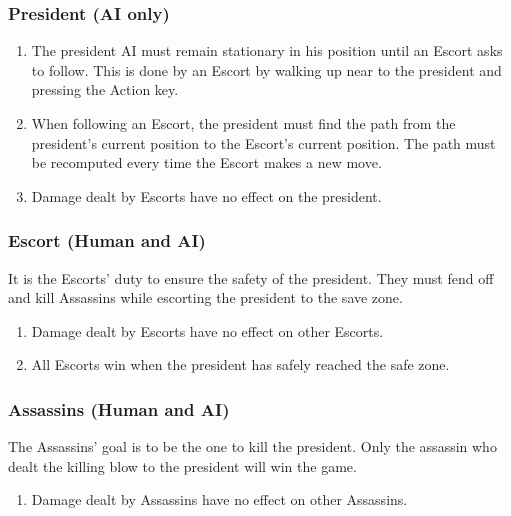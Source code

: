 \documentclass[12pt]{article}
\newenvironment{req} {\begin{enumerate}[leftmargin=2.5cm, label = \textbf{REQ \arabic{subsection}.\arabic{subsubsection}.\arabic*:}]} {\end{enumerate}}
\begin{document}
\subsubsection{President (AI only)}
\begin{req}
	\item The president AI must remain stationary in his position until an Escort asks to follow. This is done by an Escort by walking up near to the president and pressing the Action key.
	\item When following an Escort, the president must find the path from the president's current position to the Escort's current position. The path must be recomputed every time the Escort makes a new move.
	\item Damage dealt by Escorts have no effect on the president.
\end{req}

\subsubsection{Escort (Human and AI)}
It is the Escorts' duty to ensure the safety of the president. They must fend off and kill Assassins while escorting the president to the save zone.
\begin{req}
	\item Damage dealt by Escorts have no effect on other Escorts.
	\item All Escorts win when the president has safely reached the safe zone.
\end{req}

\subsubsection{Assassins (Human and AI)}
The Assassins' goal is to be the one to kill the president. Only the assassin who dealt the killing blow to the president will win the game.
\begin{req}
	\item Damage dealt by Assassins have no effect on other Assassins.
\end{req}
\end{document}

